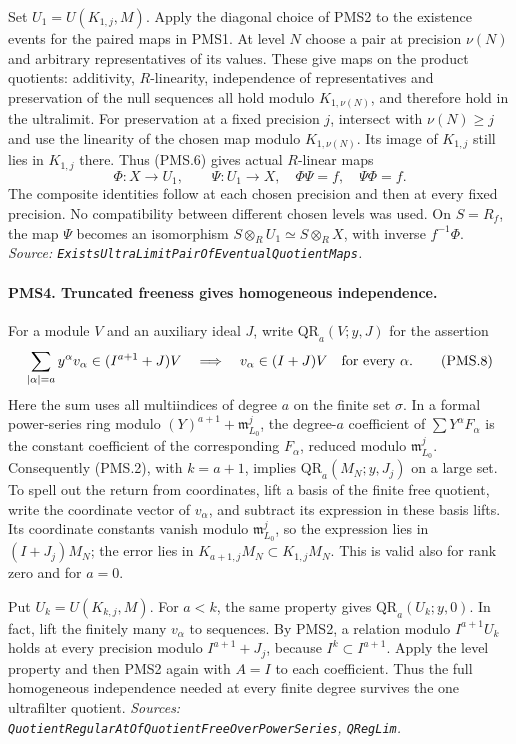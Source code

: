 Set $U_1=U(K_{1,j},M)$.  Apply the diagonal choice of PMS2 to the
existence events for the paired maps in PMS1.  At level $N$ choose a
pair at precision $\nu(N)$ and arbitrary representatives of its
values.  These give maps on the product quotients: additivity,
$R$-linearity, independence of representatives and preservation of
the null sequences all hold modulo $K_{1,\nu(N)}$, and therefore
hold in the ultralimit.  For preservation at a fixed precision $j$,
intersect with $\nu(N)\geq j$ and use the linearity of the chosen map
modulo $K_{1,\nu(N)}$.  Its image of $K_{1,j}$ still lies in
$K_{1,j}$ there.  Thus (PMS.6) gives actual $R$-linear maps
\[
 \Phi:X\longrightarrow U_1,\qquad
 \Psi:U_1\longrightarrow X,
 \quad \Phi\Psi=f,\quad\Psi\Phi=f.               \tag{PMS.7}
\]
The composite identities follow at each chosen precision and then at
every fixed precision.  No compatibility between different chosen
levels was used.  On $S=R_f$, the map $\Psi$ becomes an isomorphism
$S\otimes_R U_1\simeq S\otimes_R X$, with inverse $f^{-1}\Phi$.
\hfill\textit{Source: \texttt{ExistsUltraLimitPairOfEventualQuotientMaps}.}

\paragraph{PMS4. Truncated freeness gives homogeneous independence.}
\label{claim:PMS4}
For a module $V$ and an auxiliary ideal $J$, write
$\mathrm{QR}_a(V;y,J)$ for the assertion
\[
 \sum_{|\alpha|=a}y^\alpha v_\alpha
       \in(I^{a+1}+J)V
 \quad\Longrightarrow\quad
 v_\alpha\in(I+J)V\quad\hbox{for every }\alpha.  \tag{PMS.8}
\]
Here the sum uses all multiindices of degree $a$ on the finite set
$\sigma$.  In a formal power-series ring modulo
$(Y)^{a+1}+\mathfrak m_{L_0}^j$, the degree-$a$ coefficient of
$\sum Y^\alpha F_\alpha$ is the constant coefficient of the
corresponding $F_\alpha$, reduced modulo $\mathfrak m_{L_0}^j$.
Consequently (PMS.2), with $k=a+1$, implies
$\mathrm{QR}_a(M_N;y,J_j)$ on a large set.  To spell out the return
from coordinates, lift a basis of the finite free quotient, write
the coordinate vector of $v_\alpha$, and subtract its expression
in these basis lifts.  Its coordinate constants vanish modulo
$\mathfrak m_{L_0}^j$, so the expression lies in $(I+J_j)M_N$;
the error lies in $K_{a+1,j}M_N\subset K_{1,j}M_N$.
This is valid also for rank zero and for $a=0$.

Put $U_k=U(K_{k,j},M)$.  For $a<k$, the same property gives
$\mathrm{QR}_a(U_k;y,0)$.  In fact, lift the finitely many
$v_\alpha$ to sequences.  By PMS2, a relation modulo $I^{a+1}U_k$
holds at every precision modulo $I^{a+1}+J_j$, because
$I^k\subset I^{a+1}$.  Apply the level property and then PMS2
again with $A=I$ to each coefficient.  Thus the full homogeneous
independence needed at every finite degree survives the one
ultrafilter quotient.
\hfill\textit{Sources: \texttt{QuotientRegularAtOfQuotientFreeOverPowerSeries},
\texttt{QRegLim}.}

